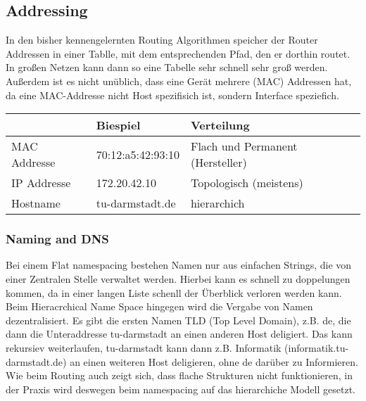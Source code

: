 	\subsection{Addressing}
		In den bisher kennengelernten Routing Algorithmen speicher der Router Addressen in einer Tablle, mit dem entsprechenden Pfad, den er dorthin routet. In großen Netzen kann dann so eine Tabelle sehr schnell sehr groß werden. Außerdem ist es nicht unüblich, dass eine Gerät mehrere (MAC) Addressen hat, da eine MAC-Addresse nicht Host spezifisich ist, sondern Interface speziefich. 
		
		\begin{table}[ht]
			\centering
			\begin{tabular}{|l|l|l|}
				\hline
						 & Biespiel          & Verteilung                       \\ \hline \hline
			MAC Addresse & 70:12:a5:42:93:10 & Flach und Permanent (Hersteller) \\ \hline
			IP Addresse  & 172.20.42.10      & Topologisch (meistens)           \\ \hline
			Hostname     & tu-darmstadt.de   & hierarchich                     \\ \hline
			\end{tabular}
		\end{table}

		\subsubsection{Naming and DNS}
			Bei einem Flat namespacing bestehen Namen nur aus einfachen Strings, die von einer Zentralen Stelle verwaltet werden. Hierbei kann es schnell zu doppelungen kommen, da in einer langen Liste schenll der Überblick verloren werden kann. \\
			Beim Hieracrchical Name Space hingegen wird die Vergabe von Namen dezentralisiert. Es gibt die ersten Namen TLD (Top Level Domain), z.B. de, die dann die Unteraddresse tu-darmstadt an einen anderen Host deligiert. Das kann rekursiev weiterlaufen, tu-darmstadt kann dann z.B. Informatik (informatik.tu-darmstadt.de) an einen weiteren Host deligieren, ohne de darüber zu Informieren. Wie beim Routing auch zeigt sich, dass flache Strukturen nicht funktionieren, in der Praxis wird deswegen beim namespacing auf das hierarchiche Modell gesetzt. 

